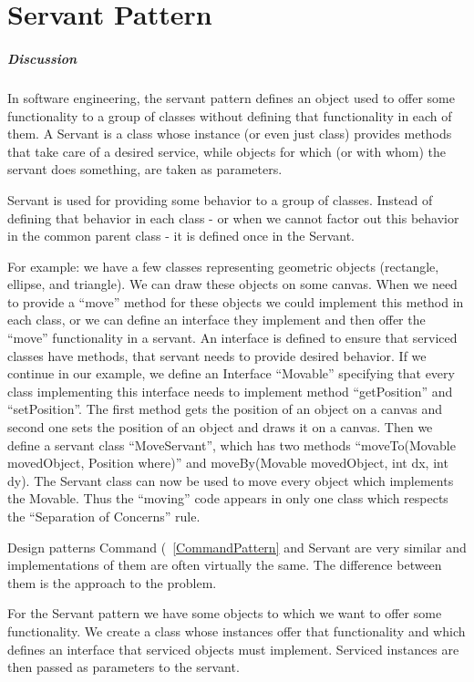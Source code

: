 \documentclass{book}
\begin{document}
\chapter{Servant Pattern}\label{ServantPattern}
\paragraph{Discussion}\mbox{}
In software engineering, the servant pattern defines an object used to offer some functionality to a group of classes without defining that functionality in each of them.
A Servant is a class whose instance (or even just class) provides methods that take care of a desired service, while objects for which (or with whom) the servant does something, are taken as parameters.

Servant is used for providing some behavior to a group of classes.
Instead of defining that behavior in each class - or when we cannot factor out this behavior in the common parent class - it is defined once in the Servant.

For example: we have a few classes representing geometric objects (rectangle, ellipse, and triangle).
We can draw these objects on some canvas.
When we need to provide a “move” method for these objects we could implement this method in each class, or we can define an interface they implement and then offer the “move” functionality in a servant.
An interface is defined to ensure that serviced classes have methods, that servant needs to provide desired behavior.
If we continue in our example, we define an Interface “Movable” specifying that every class implementing this interface needs to implement method “getPosition” and “setPosition”.
The first method gets the position of an object on a canvas and second one sets the position of an object and draws it on a canvas.
Then we define a servant class “MoveServant”, which has two methods “moveTo(Movable movedObject, Position where)” and moveBy(Movable movedObject, int dx, int dy).
The Servant class can now be used to move every object which implements the Movable. Thus the “moving” code appears in only one class which respects the “Separation of Concerns” rule.

Design patterns Command (~\ref{CommandPattern} and Servant are very similar and implementations of them are often virtually the same. The difference between them is the approach to the problem.

    For the Servant pattern we have some objects to which we want to offer some functionality.
    We create a class whose instances offer that functionality and which defines an interface that serviced objects must implement.
    Serviced instances are then passed as parameters to the servant.
\end{document}
